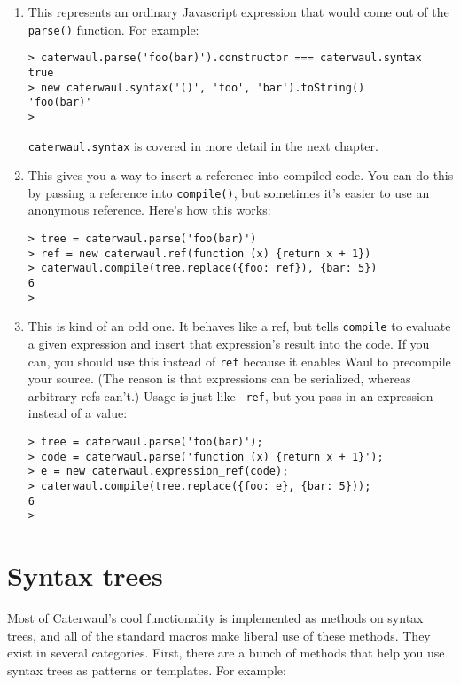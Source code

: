 \documentclass{report}
\begin{document}
\begin{enumerate}
\item[{\tt caterwaul.syntax}]
  This represents an ordinary Javascript expression that would come out of the {\tt parse()} function. For example:

\begin{verbatim}
> caterwaul.parse('foo(bar)').constructor === caterwaul.syntax
true
> new caterwaul.syntax('()', 'foo', 'bar').toString()
'foo(bar)'
>
\end{verbatim}

  {\tt caterwaul.syntax} is covered in more detail in the next chapter.

\item[{\tt caterwaul.ref}]
  This gives you a way to insert a reference into compiled code. You can do this by passing a reference into {\tt compile()}, but sometimes it's easier to use an anonymous reference.
  Here's how this works:

\begin{verbatim}
> tree = caterwaul.parse('foo(bar)')
> ref = new caterwaul.ref(function (x) {return x + 1})
> caterwaul.compile(tree.replace({foo: ref}), {bar: 5})
6
>
\end{verbatim}

\item[{\tt caterwaul.expression\_ref}]
  This is kind of an odd one. It behaves like a ref, but tells {\tt compile} to evaluate a given expression and insert that expression's result into the code. If you can, you should use
  this instead of {\tt ref} because it enables Waul to precompile your source. (The reason is that expressions can be serialized, whereas arbitrary refs can't.) Usage is just like {\tt
  ref}, but you pass in an expression instead of a value:

\begin{verbatim}
> tree = caterwaul.parse('foo(bar)');
> code = caterwaul.parse('function (x) {return x + 1}');
> e = new caterwaul.expression_ref(code);
> caterwaul.compile(tree.replace({foo: e}, {bar: 5}));
6
>
\end{verbatim}
\end{enumerate}

\chapter{Syntax trees}
  Most of Caterwaul's cool functionality is implemented as methods on syntax trees, and all of the standard macros make liberal use of these methods. They exist in several categories. First,
  there are a bunch of methods that help you use syntax trees as patterns or templates. For example:
\end{document}
